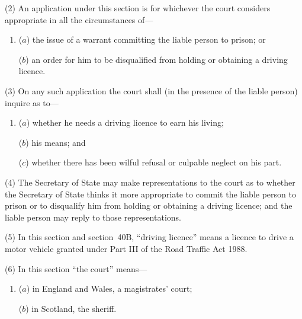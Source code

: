 \documentclass[12pt,a4paper]{article}
\begin{document}
(2) An application under this section is for whichever the court considers appropriate in all the circumstances of—
\begin{enumerate}\item[]
($a$) the issue of a warrant committing the liable person to prison; or

($b$) an order for him to be disqualified from holding or obtaining a driving licence.
\end{enumerate}

(3) On any such application the court shall (in the presence of the liable person) inquire as to—
\begin{enumerate}\item[]
($a$) whether he needs a driving licence to earn his living;

($b$) his means; and

($c$) whether there has been wilful refusal or culpable neglect on his part.
\end{enumerate}

(4) The 
Secretary of State  %
may make representations to the court as to whether 
the Secretary of State  %
thinks it more appropriate to commit the liable person to prison or to disqualify him from holding or obtaining a driving licence; and the liable person may reply to those representations.

(5) In this section and section~40B, “driving licence” means a licence to drive a motor vehicle granted under Part III of the Road Traffic Act 1988. 

(6) In this section “the court” means—
\begin{enumerate}\item[]
($a$) in England and Wales, a magistrates' court;

($b$) in Scotland, the sheriff.
\end{enumerate}
\end{document}
